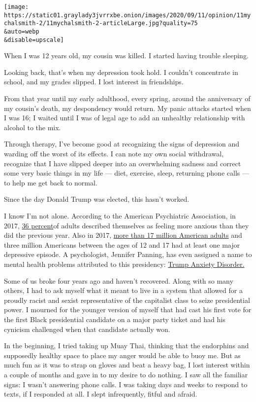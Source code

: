\texttt{[image: https://static01.graylady3jvrrxbe.onion/images/2020/09/11/opinion/11mychalsmith-2/11mychalsmith-2-articleLarge.jpg?quality=75\\\&auto=webp\\\&disable=upscale]}

When I was 12 years old, my cousin was killed. I started having trouble
sleeping.

Looking back, that's when my depression took hold. I couldn't
concentrate in school, and my grades slipped. I lost interest in
friendships.

From that year until my early adulthood, every spring, around the
anniversary of my cousin's death, my despondency would return. My panic
attacks started when I was 16; I waited until I was of legal age to add
an unhealthy relationship with alcohol to the mix.

Through therapy, I've become good at recognizing the signs of depression
and warding off the worst of its effects. I can note my own social
withdrawal, recognize that I have slipped deeper into an overwhelming
sadness and correct some very basic things in my life --- diet,
exercise, sleep, returning phone calls --- to help me get back to
normal.

Since the day Donald Trump was elected, this hasn't worked.

I know I'm not alone. According to the American Psychiatric Association,
in 2017,
\href{https://www.psychiatry.org/newsroom/apa-public-opinion-poll-annual-meeting-2017}{36
percent}of adults described themselves as feeling more anxious than they
did the previous year. Also in 2017,
\href{https://www.nimh.nih.gov/health/statistics/major-depression.shtml}{more
than 17 million American adults} and three million Americans between the
ages of 12 and 17 had at least one major depressive episode. A
psychologist, Jennifer Panning, has even assigned a name to mental
health problems attributed to this presidency:
\href{https://www.politico.com/magazine/story/2018/10/12/donald-trump-anxiety-disorder-pscyhologists-221305}{Trump
Anxiety Disorder.}

Some of us broke four years ago and haven't recovered. Along with so
many others, I had to ask myself what it meant to live in a system that
allowed for a proudly racist and sexist representative of the capitalist
class to seize presidential power. I mourned for the younger version of
myself that had cast his first vote for the first Black presidential
candidate on a major party ticket and had his cynicism challenged when
that candidate actually won.

In the beginning, I tried taking up Muay Thai, thinking that the
endorphins and supposedly healthy space to place my anger would be able
to buoy me. But as much fun as it was to strap on gloves and beat a
heavy bag, I lost interest within a couple of months and gave in to my
desire to do nothing. I saw all the familiar signs: I wasn't answering
phone calls. I was taking days and weeks to respond to texts, if I
responded at all. I slept infrequently, fitful and afraid.

